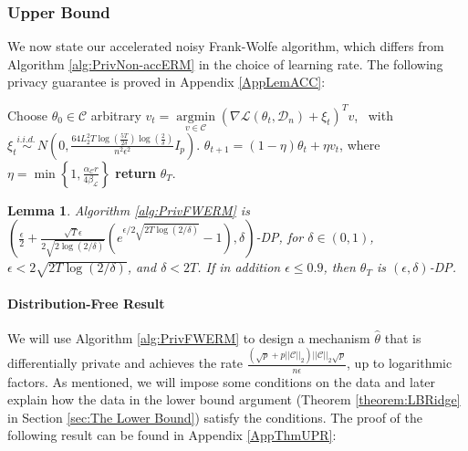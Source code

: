 \documentclass{article}
\newtheorem{lemma}{Lemma}
\newcommand{\iid}{i.i.d.{\ }}
\begin{document}

\subsubsection{Upper Bound}
\label{sec:The Upper Bound}

We now state our accelerated noisy Frank-Wolfe algorithm, which differs from Algorithm \ref{alg:PrivNon-accERM} in the choice of learning rate. The following privacy guarantee is proved in Appendix \ref{AppLemACC}:

\begin{algorithm}
\caption{Private Frank-Wolfe for ERM}
\label{alg:PrivFWERM}
\begin{algorithmic}[1]
    \State Choose $\theta_0 \in \mathcal{C}$ arbitrary
    \State $v_t = \mathop{\arg \min}\limits_{v \in \mathcal{C}} (\nabla \mathcal{L}(\theta_t, \mathcal{D}_n) + \xi_t)^Tv$, \ with \ $\xi_t \overset{\iid}{\sim} N\left(0, \frac{64L_2^2 T \log\left(\frac{5T}{2\delta}\right)\log\left(\frac{2}{\delta}\right)}{n^2\epsilon^2}I_p\right)$.
        \State $\theta_{t + 1} = (1 - \eta)\theta_t + \eta v_t$, where $\eta = \min\left\{1, \frac{\alpha_{\mathcal{C}}r}{4\beta_{\mathcal{L}}}\right\}$
    \EndFor
    \State \textbf{return} $\theta_T$.
\EndFunction
\end{algorithmic}
\end{algorithm}

\begin{lemma}
\label{lemma:ACC_PRIV_FW_STEP}
Algorithm \ref{alg:PrivFWERM} is $\left(\frac{\epsilon}{2} + \frac{\sqrt{T}\epsilon}{2\sqrt{2\log(2/\delta)}}(e^{\epsilon/2\sqrt{2T\log(2/\delta)}} - 1), \delta\right)$-DP, for $\delta \in (0, 1)$, $\epsilon < 2\sqrt{2T\log(2/\delta)}$, and $\delta < 2T$. If in addition $\epsilon \leq 0.9$, then $\theta_T$ is $(\epsilon, \delta)$-DP.
\end{lemma}

\paragraph{Distribution-Free Result}

We will use Algorithm \ref{alg:PrivFWERM} to design a mechanism $\hat{\theta}$ that is differentially private and achieves the rate $\frac{(\sqrt{p} + p||\mathcal{C}||_2)||\mathcal{C}||_2\sqrt{p}}{n\epsilon}$, up to logarithmic factors. As mentioned, we will impose some conditions on the data and later explain how the data in the lower bound argument (Theorem \ref{theorem:LBRidge} in Section \ref{sec:The Lower Bound}) satisfy the conditions. The proof of the following result can be found in Appendix \ref{AppThmUPR}:
\end{document}
